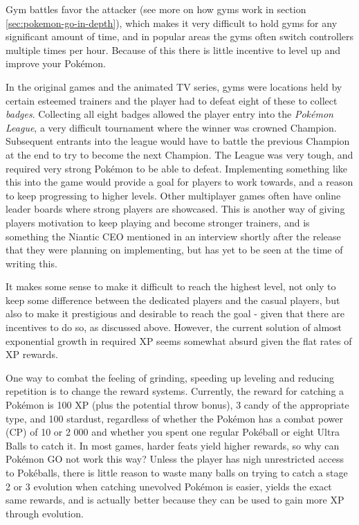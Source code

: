 Gym battles favor the attacker (see more on how gyms work in section \ref{sec:pokemon-go-in-depth}), which makes it very difficult to hold gyms for any significant amount of time, and in popular areas the gyms often switch controllers multiple times per hour. Because of this there is little incentive to level up and improve your Pokémon.

In the original games and the animated TV series, gyms were locations held by certain esteemed trainers and the player had to defeat eight of these to collect \emph{badges}. Collecting all eight badges allowed the player entry into the \emph{Pokémon League}, a very difficult tournament where the winner was crowned Champion. Subsequent entrants into the league would have to battle the previous Champion at the end to try to become the next Champion. The League was very tough, and required very strong Pokémon to be able to defeat. Implementing something like this into the game would provide a goal for players to work towards, and a reason to keep progressing to higher levels. Other multiplayer games often have online leader boards where strong players are showcased. This is another way of giving players motivation to keep playing and become stronger trainers, and is something the Niantic CEO mentioned in an interview shortly after the release  that they were planning on implementing, but has yet to be seen at the time of writing this.

It makes some sense to make it difficult to reach the highest level, not only to keep some difference between the dedicated players and the casual players, but also to make it prestigious and desirable to reach the goal - given that there are incentives to do so, as discussed above. However, the current solution of almost exponential growth in required XP seems somewhat absurd  given the flat rates of XP rewards.

One way to combat the feeling of grinding, speeding up leveling and reducing repetition is to change the reward systems. Currently, the reward for catching a Pokémon is 100 XP (plus the potential throw bonus), 3 candy of the appropriate type, and 100 stardust, regardless of whether the Pokémon has a combat power (CP) of 10 or 2 000 and whether you spent one regular Pokéball or eight Ultra Balls to catch it. In most games, harder feats yield higher rewards, so why can Pokémon GO not work this way? Unless the player has nigh unrestricted access to Pokéballs, there is little reason to waste many balls on trying to catch a stage 2 or 3 evolution when catching unevolved Pokémon is easier, yields the exact same rewards, and is actually better because they can be used to gain more XP through evolution.

